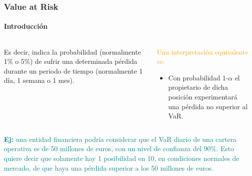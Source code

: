 \documentclass[aspectratio=169]{beamer}
\begin{document}
\begin{frame}
\frametitle{Value at Risk}
\framesubtitle{Introducción}



\begin{columns}
\begin{column}{0.5\textwidth}

\vspace{10mm}

\begin{center}
Es decir, indica la probabilidad (normalmente 1\% o 5\%) de sufrir una determinada pérdida durante un periodo de tiempo (normalmente 1 día, 1 semana o 1 mes).
\end{center}

\vspace{4mm}

\end{column}
\begin{column}{0.5\textwidth}  %

\begin{center}
\textcolor{orange}{Una interpretación equivalente es:}\\
\end{center}

\vspace{2mm}

\begin{itemize}
\item Con probabilidad 1-$\alpha$ el propietario de dicha posición experimentará una pérdida no superior al VaR.
\end{itemize}

\end{column}
\end{columns}


\pause
\begin{center}
\textcolor{teal}{\textbf{Ej:} una entidad financiera podría considerar que el VaR diario de una cartera operativa es de 50 millones de euros, con un nivel de confianza del 90\%. Esto quiere decir que solamente hay 1 posibilidad en 10, en condiciones normales de mercado, de que haya una pérdida superior a los 50 millones de euros.}
\end{center}



\end{frame}



\end{document}
